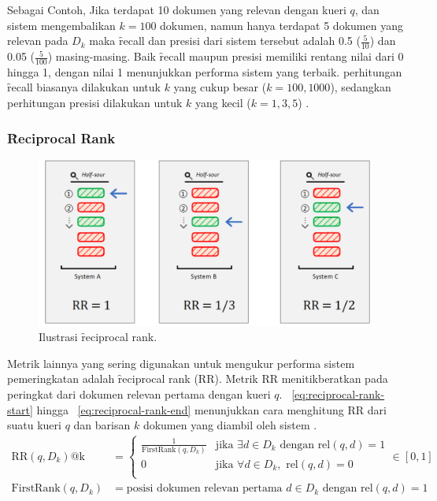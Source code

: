         Sebagai Contoh, Jika terdapat 10 dokumen yang relevan dengan kueri $q$, dan sistem mengembalikan $k=100$ dokumen, namun hanya terdapat 5 dokumen yang relevan pada $D_k$  maka \f{recall} dan presisi dari sistem tersebut adalah 0.5 ($\frac{5}{10}$) dan 0.05 ($\frac{5}{100}$) masing-masing. Baik \f{recall} maupun presisi memiliki rentang nilai dari 0 hingga 1, dengan nilai 1 menunjukkan performa sistem yang terbaik. perhitungan \f{recall} biasanya dilakukan untuk $k$ yang cukup besar ($k = 100,1000 $), sedangkan perhitungan presisi dilakukan untuk $k$ yang kecil ($k = 1, 3, 5$) \citep{irlecture}.


        \subsubsection{\f{Reciprocal Rank}}

        \begin{figure}
            \centering
            \includegraphics[width=1\textwidth]{assets/pics/rr.png}
            \caption{Ilustrasi \f{reciprocal rank}.}
            \label{fig:reciprocal-rank}
        \end{figure}
        Metrik lainnya yang sering digunakan untuk mengukur performa sistem pemeringkatan adalah \f{reciprocal rank} (RR). Metrik RR menitikberatkan pada peringkat dari dokumen relevan pertama dengan kueri $q$. \equ~\ref{eq:reciprocal-rank-start} hingga \equ~\ref{eq:reciprocal-rank-end} menunjukkan cara menghitung RR dari suatu kueri $q$ dan barisan $k$ dokumen yang diambil oleh sistem \citep{irlejcture, textrankingsurvey}.
        \begin{align}
            \text{RR}(q, D_k)\text{@k} &= \begin{cases}
                \label{eq:reciprocal-rank-start}
                \frac{1}{\text{FirstRank}(q, D_k)} & \text{jika } \exists d \in D_k \text{ dengan } \text{rel}(q, d) = 1 \\        
                0 & \text{jika } \forall d \in D_k, \text{ rel}(q, d) = 0 \\
                \end{cases} \in [0, 1] \\
                \label{eq:reciprocal-rank-end}
                \text{FirstRank}(q,D_k) &= \text{posisi dokumen relevan pertama } d\in D_k \text{ dengan } \text{rel}(q, d) = 1
        \end{align}

